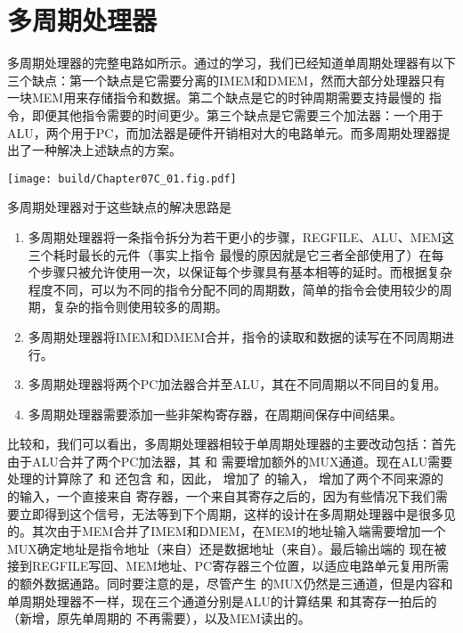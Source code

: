 \section{多周期处理器}

多周期处理器的完整电路如所示。通过的学习，我们已经知道单周期处理器有以下三个缺点：第一个缺点是它需要分离的IMEM和DMEM，然而大部分处理器只有一块MEM用来存储指令和数据。第二个缺点是它的时钟周期需要支持最慢的 指令，即便其他指令需要的时间更少。第三个缺点是它需要三个加法器：一个用于ALU，两个用于PC，而加法器是硬件开销相对大的电路单元。而多周期处理器提出了一种解决上述缺点的方案。
\begin{Figure}
    \texttt{[image: build/Chapter07C\_01.fig.pdf]}
\end{Figure}

多周期处理器对于这些缺点的解决思路是
\begin{enumerate}
    \item 多周期处理器将一条指令拆分为若干更小的步骤，REGFILE、ALU、MEM这三个耗时最长的元件（事实上指令 最慢的原因就是它三者全部使用了）在每个步骤只被允许使用一次，以保证每个步骤具有基本相等的延时。而根据复杂程度不同，可以为不同的指令分配不同的周期数，简单的指令会使用较少的周期，复杂的指令则使用较多的周期。
    \item 多周期处理器将IMEM和DMEM合并，指令的读取和数据的读写在不同周期进行。
    \item 多周期处理器将两个PC加法器合并至ALU，其在不同周期以不同目的复用。
    \item 多周期处理器需要添加一些非架构寄存器，在周期间保存中间结果。
\end{enumerate}
比较和，我们可以看出，多周期处理器相较于单周期处理器的主要改动包括：首先由于ALU合并了两个PC加法器，其 和 需要增加额外的MUX通道。现在ALU需要处理的计算除了 和 还包含 和，因此， 增加了 的输入， 增加了两个不同来源的 的输入，一个直接来自 寄存器，一个来自其寄存之后的，因为有些情况下我们需要立即得到这个信号，无法等到下个周期，这样的设计在多周期处理器中是很多见的。其次由于MEM合并了IMEM和DMEM，在MEM的地址输入端需要增加一个MUX确定地址是指令地址（来自）还是数据地址（来自）。最后输出端的 现在被接到REGFILE写回、MEM地址、PC寄存器三个位置，以适应电路单元复用所需的额外数据通路。同时要注意的是，尽管产生 的MUX仍然是三通道，但是内容和单周期处理器不一样，现在三个通道分别是ALU的计算结果 和其寄存一拍后的（新增，原先单周期的 不再需要），以及MEM读出的。

